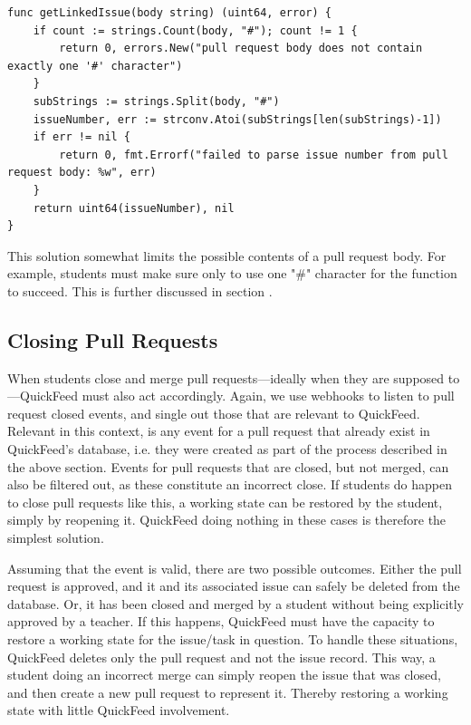 \begin{lstlisting}[caption={The getLinkedIssue function}, language=Golang]
func getLinkedIssue(body string) (uint64, error) {
	if count := strings.Count(body, "#"); count != 1 {
		return 0, errors.New("pull request body does not contain exactly one '#' character")
	}
	subStrings := strings.Split(body, "#")
	issueNumber, err := strconv.Atoi(subStrings[len(subStrings)-1])
	if err != nil {
		return 0, fmt.Errorf("failed to parse issue number from pull request body: %w", err)
	}
	return uint64(issueNumber), nil
}
\end{lstlisting}

This solution somewhat limits the possible contents of a pull request body.
For example, students must make sure only to use one "\#" character for the function to succeed.
This is further discussed in section .%

\subsection{Closing Pull Requests}

When students close and merge pull requests---ideally when they are supposed to---QuickFeed must also act accordingly.
Again, we use webhooks to listen to pull request closed events, and single out those that are relevant to QuickFeed.
Relevant in this context, is any event for a pull request that already exist in QuickFeed's database, i.e. they were created as part of the process described in the above section.
Events for pull requests that are closed, but not merged, can also be filtered out, as these constitute an incorrect close.
If students do happen to close pull requests like this, a working state can be restored by the student, simply by reopening it.
QuickFeed doing nothing in these cases is therefore the simplest solution.

Assuming that the event is valid, there are two possible outcomes.
Either the pull request is approved, and it and its associated issue can safely be deleted from the database.
Or, it has been closed and merged by a student without being explicitly approved by a teacher.
If this happens, QuickFeed must have the capacity to restore a working state for the issue/task in question.
To handle these situations, QuickFeed deletes only the pull request and not the issue record.
This way, a student doing an incorrect merge can simply reopen the issue that was closed, and then create a new pull request to represent it.
Thereby restoring a working state with little QuickFeed involvement.


